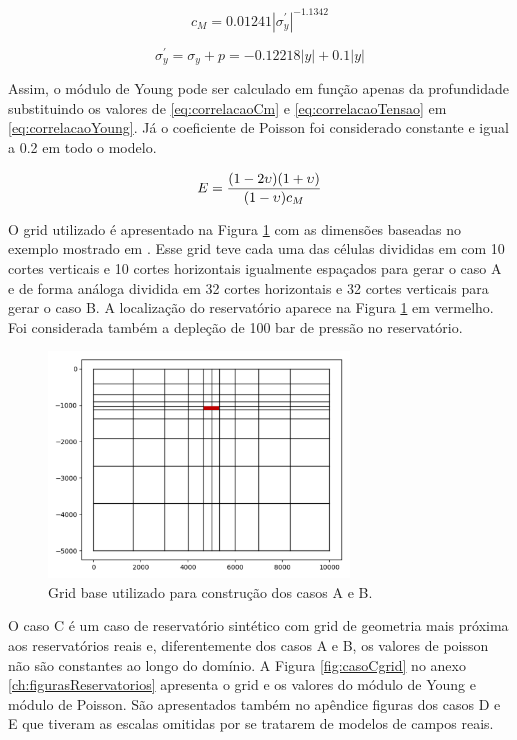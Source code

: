\begin{equation} \label{eq:correlacaoCm}
    c_M = 0.01241 |\sigma_y^\prime|^{-1.1342}
\end{equation}

\begin{equation} \label{eq:correlacaoTensao}
\sigma_y^\prime = \sigma_y + p = -0.12218|y| + 0.1 |y|
\end{equation}

Assim, o módulo de Young pode ser calculado em função apenas da profundidade substituindo os valores de \eqref{eq:correlacaoCm} e \eqref{eq:correlacaoTensao} em \eqref{eq:correlacaoYoung}. Já o coeficiente de Poisson foi considerado constante e igual a 0.2 em todo o modelo. 

\begin{equation} \label{eq:correlacaoYoung}
    E = \frac{(1-2\upsilon)(1+\upsilon)}{(1-\upsilon)c_M}
\end{equation}

O grid utilizado é apresentado na Figura \ref{fig:gridBase10x10} com as dimensões baseadas no exemplo mostrado em \cite{casteletto}. Esse grid teve cada uma das células divididas em com 10 cortes verticais e 10 cortes horizontais igualmente espaçados para gerar o caso A e de forma análoga dividida em 32 cortes horizontais e 32 cortes verticais para gerar o caso B. A localização do reservatório aparece na Figura \ref{fig:gridBase10x10} em vermelho. Foi considerada também a depleção de 100 bar de pressão no reservatório.

\begin{figure}[!htbp]
    \centering
    \includegraphics[height=6cm]{chap08/figs/Reservoir10x10_grid.png}
    \caption{Grid base utilizado para construção dos casos A e B.}
    \label{fig:gridBase10x10}
\end{figure}


O caso C é um caso de reservatório sintético com grid de geometria mais próxima aos reservatórios reais e,  diferentemente dos casos A e B, os valores de poisson não são constantes ao longo do domínio. A Figura \ref{fig:casoCgrid} no anexo \ref{ch:figurasReservatorios} apresenta o grid e os valores do módulo de Young e módulo de Poisson. São apresentados também no apêndice figuras dos casos D e E que tiveram as escalas omitidas por se tratarem de modelos de campos reais.


